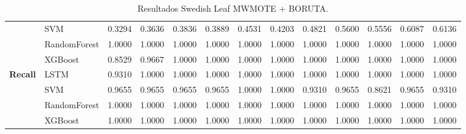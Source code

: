 \begin{table}[h]
\begin{adjustbox}{max width=15cm}
\begin{tabular}{|c|l|r|r|r|r|r|r|r|r|r|r|r|}
		& SVM &  0.3294 &  0.3636 &  0.3836 &  0.3889 &  0.4531 &  0.4203 &  0.4821 &  0.5600 &  0.5556 &  0.6087 &  0.6136 \\
		& RandomForest &  1.0000 &  1.0000 &  1.0000 &  1.0000 &  1.0000 &  1.0000 &  1.0000 &  1.0000 &  1.0000 &  1.0000 &  1.0000 \\
		& XGBoost &  0.8529 &  0.9667 &  1.0000 &  1.0000 &  1.0000 &  1.0000 &  1.0000 &  1.0000 &  1.0000 &  1.0000 &  1.0000 \\
		\hline
		\textbf{Recall} & LSTM &  0.9310 &  1.0000 &  1.0000 &  1.0000 &  1.0000 &  1.0000 &  1.0000 &  1.0000 &  1.0000 &  1.0000 &  1.0000 \\
		& SVM &  0.9655 &  0.9655 &  0.9655 &  0.9655 &  1.0000 &  1.0000 &  0.9310 &  0.9655 &  0.8621 &  0.9655 &  0.9310 \\
		& RandomForest &  1.0000 &  1.0000 &  1.0000 &  1.0000 &  1.0000 &  1.0000 &  1.0000 &  1.0000 &  1.0000 &  1.0000 &  1.0000 \\
		& XGBoost &  1.0000 &  1.0000 &  1.0000 &  1.0000 &  1.0000 &  1.0000 &  1.0000 &  1.0000 &  1.0000 &  1.0000 &  1.0000 \\
		\hline
	\end{tabular}
\end{adjustbox}
\caption{Resultados Swedish Leaf MWMOTE + BORUTA.}
\label{tab:SLeaf_MWMOTE_BORUTA}
\end{table}
\newpage

